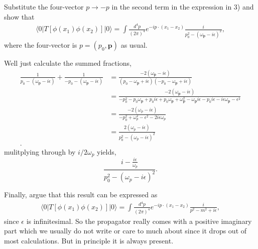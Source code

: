 \documentclass[working, oneside]{../../Preambles/tuftebook}
\begin{document}
\begin{exercise}[4]
Substitute the four-vector $p \to -p$ in the second term in the expression in 3) and show that
\begin{align*}
\langle 0 | T \left[ \phi(x_1) \phi(x_2) \right] | 0 \rangle = \int \frac{d^4 p}{(2\pi)^4} e^{-ip \cdot (x_1 - x_2)} \frac{i}{p_0^2 - (\omega_\mathbf{p} - i\epsilon)^2},
\end{align*}
where the four-vector is $p = (p_0, \mathbf{p})$ as usual.
\end{exercise}
Well just calculate the summed fractions,
\begin{align*}
    \frac{1}{p_0 - \left( \omega_\mathbf{p} - i\epsilon \right) } + \frac{1}{-p_0 - \left( \omega_\mathbf{p} - i\epsilon \right) } &= \frac{-2\left( \omega_{\mathbf{p}} - i\epsilon \right) }{\left( p_0 - \omega_{\mathbf{p}} + i\epsilon \right)\left( -p_0 - \omega_{\mathbf{p}} + i\epsilon \right)  } \\
    &= \frac{-2\left( \omega_{\mathbf{p}}-i\epsilon \right) }{-p_0^2 - p_0\omega_{\mathbf{p}} + p_0i\epsilon + p_0\omega_{\mathbf{p}} +\omega_{\mathbf{p}}^2 -\omega_{\mathbf{p}}i\epsilon - p_0i\epsilon - i\epsilon\omega_{\mathbf{p}} -\epsilon^2} \\
&= \frac{-2\left( \omega_p - i\epsilon \right) }{-p_0^2 + \omega_p^2 - \epsilon^2 -2i\epsilon\omega_p} \\
&= \frac{2\left( \omega_p - i\epsilon \right) }{p_0^2 - \left( \omega_p - i\epsilon \right)^2 } \\
.\end{align*}
mulitplying through by $i /2\omega_p$ yields,
\[
\frac{i - \frac{i\epsilon}{\omega_p} }{p_0^2 - \left( \omega_p - i\epsilon \right)^2 } 
.\] 
\begin{exercise}[5]
Finally, argue that this result can be expressed as
\begin{align*}
\langle 0 | T \left[ \phi(x_1) \phi(x_2) \right] | 0 \rangle = \int \frac{d^4 p}{(2\pi)^4} e^{-ip \cdot (x_1 - x_2)} \frac{i}{p^2 - m^2 + i\epsilon},
\end{align*}
since $\epsilon$ is infinitesimal. So the propagator really comes with a positive imaginary part which we usually do not write or care to much about since it drops out of most calculations. But in principle it is always present.
\end{exercise}
\end{document}
